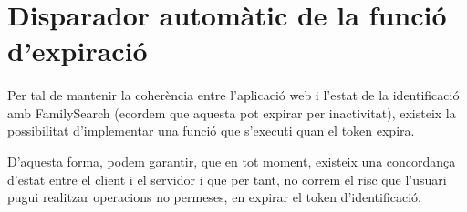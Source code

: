 \section{Disparador automàtic de la funció d'expiració}

    \paragraph{}
    Per tal de mantenir la coherència entre l'aplicació web i l'estat de la identificació amb FamilySearch (ecordem que aquesta pot expirar per inactivitat), existeix la possibilitat d'implementar una funció que s'executi quan el token expira.

    D'aquesta forma, podem garantir, que en tot moment, existeix una concordança d'estat entre el client i el servidor i que per tant, no correm el risc que l'usuari pugui realitzar operacions no permeses, en expirar el token d’identificació.
